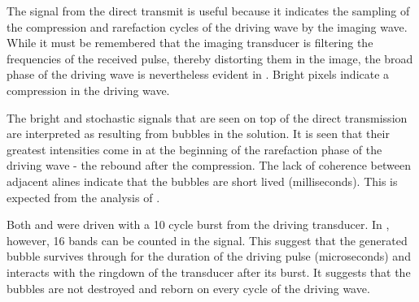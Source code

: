 The signal from the direct transmit is useful because it indicates the sampling of the compression
and rarefaction cycles of the driving wave by the imaging wave.
While it must be remembered that the imaging transducer is filtering the frequencies of the received pulse,
thereby distorting them in the image, 
the broad phase of the driving wave is nevertheless evident in .
Bright pixels indicate a compression in the driving wave.

The bright and stochastic signals that are seen on top of the direct transmission 
are interpreted as resulting from bubbles in the solution.
It is seen that their greatest intensities come in at the beginning of the rarefaction phase of the driving wave - the rebound after the compression. 
The lack of coherence between adjacent alines indicate that the bubbles are short lived (milliseconds).
This is expected from the analysis of .

Both  and  were driven with a
10 cycle burst from the driving transducer.
In , however, 16 bands can be counted in the signal.
This suggest that the generated bubble survives through for the duration of the driving pulse (microseconds)
and interacts with the ringdown of the transducer after its burst.
It suggests that the bubbles are not destroyed and reborn on every cycle of the driving wave.


